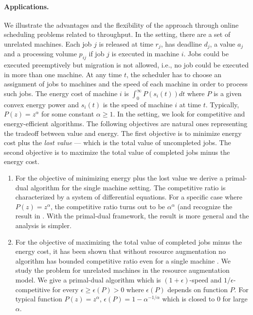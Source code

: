 \documentclass[11pt]{article}
\begin{document}
\paragraph{Applications.}	 We illustrate the advantages and the flexibility of the approach through 
online scheduling problems related to throughput. In the setting, there are a set of 
unrelated machines. Each job $j$ is released at time $r_{j}$, has deadline $d_{j}$, a value $a_{j}$ and 
a processing volume $p_{ij}$ if job $j$ is executed in machine $i$. 
Jobs could be executed preemptively but migration is not allowed, 
i.e., no job could be executed in more than one machine. At any time $t$, the scheduler 
has to choose an assignment of jobs to machines and the speed of each machine 
in order to process such jobs. The energy cost of machine $i$ is 
$\int_{0}^{\infty} P(s_{i}(t))dt$ where $P$ is a given convex energy power and $s_{i}(t)$
is the speed of machine $i$ at time $t$. Typically, $P(z) = z^{\alpha}$ for some constant $\alpha \geq 1$. 
In the setting, we look for competitive and energy-efficient algorithms. The following objectives 
are natural ones representing the tradeoff between value and energy. 
The first objective is to minimize energy cost plus the \emph{lost value} 
--- which is the total value of uncompleted jobs. The second objective is to maximize 
 the total value of completed jobs minus the energy cost.

\begin{enumerate}
	\item For the objective of minimizing energy plus the lost value 
	we derive a primal-dual algorithm for the single machine setting. 
	The competitive ratio is characterized by a system
	of differential equations. For a specific case where $P(z) = z^{\alpha}$, the competitive
	ratio turns out to be $\alpha^{\alpha}$ (and recognize the result in \cite{KlingPietrzyk13:Profitable-Scheduling}. 
	With the primal-dual framework, the result is more general and the analysis is simpler.
\item For the objective of maximizing the total value of completed jobs minus the energy cost,
	it has been shown that without resource augmentation 
	no algorithm has bounded competitive ratio even for a single machine \cite{PruhsStein10:How-to-Schedule-When}.
	We study the problem for unrelated machines in the resource augmentation model. We give a primal-dual 
	algorithm which is $(1+\epsilon)$-speed and $1/\epsilon$-competitive for 
	every $\epsilon \geq \epsilon(P) > 0$ where $\epsilon(P)$ depends on function $P$.
	For typical function $P(z) = z^{\alpha}$, $\epsilon(P) = 1 - \alpha^{-1/\alpha}$
	which is closed to 0 for large $\alpha$.
\end{enumerate}
\end{document}
